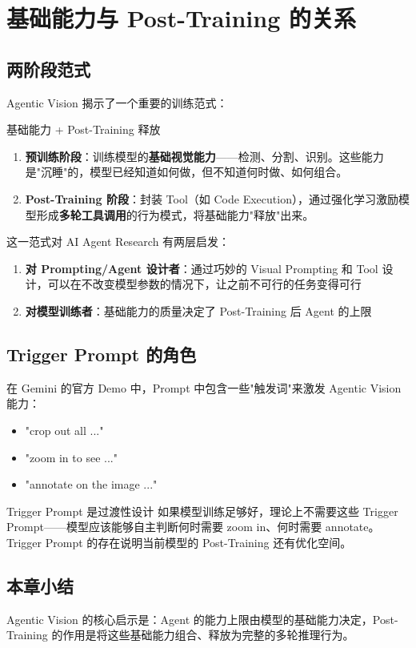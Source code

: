 \section{基础能力与 Post-Training 的关系}

\subsection{两阶段范式}

Agentic Vision 揭示了一个重要的训练范式：

\begin{importantbox}{基础能力 + Post-Training 释放}
\begin{enumerate}
    \item \textbf{预训练阶段}：训练模型的\textbf{基础视觉能力}——检测、分割、识别。这些能力是"沉睡"的，模型已经知道如何做，但不知道何时做、如何组合。
    \item \textbf{Post-Training 阶段}：封装 Tool（如 Code Execution），通过强化学习激励模型形成\textbf{多轮工具调用}的行为模式，将基础能力"释放"出来。
\end{enumerate}
\end{importantbox}

这一范式对 AI Agent Research 有两层启发：

\begin{enumerate}
    \item \textbf{对 Prompting/Agent 设计者}：通过巧妙的 Visual Prompting 和 Tool 设计，可以在不改变模型参数的情况下，让之前不可行的任务变得可行
    \item \textbf{对模型训练者}：基础能力的质量决定了 Post-Training 后 Agent 的上限
\end{enumerate}

\subsection{Trigger Prompt 的角色}

在 Gemini 的官方 Demo 中，Prompt 中包含一些"触发词"来激发 Agentic Vision 能力：

\begin{itemize}
    \item "crop out all ..."
    \item "zoom in to see ..."
    \item "annotate on the image ..."
\end{itemize}

\begin{knowledgebox}{Trigger Prompt 是过渡性设计}
如果模型训练足够好，理论上不需要这些 Trigger Prompt——模型应该能够自主判断何时需要 zoom in、何时需要 annotate。Trigger Prompt 的存在说明当前模型的 Post-Training 还有优化空间。
\end{knowledgebox}

\subsection{本章小结}

Agentic Vision 的核心启示是：Agent 的能力上限由模型的基础能力决定，Post-Training 的作用是将这些基础能力组合、释放为完整的多轮推理行为。


